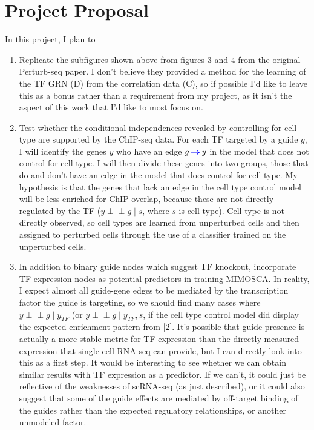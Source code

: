 \documentclass[letterpaper, 11pt]{article}
\def\ci{\perp\!\!\!\perp}
\DeclareMathOperator{\diedgeright}{\textcolor{blue}{\boldsymbol{\rightarrow}}}
\begin{document}
\section*{Project Proposal}
In this project, I plan to
\begin{enumerate}
\item Replicate the subfigures shown above from figures 3 and 4 from the original Perturb-seq paper. I don't believe they provided a method for the learning of the TF GRN (D) from the correlation data (C), so if possible I'd like to leave this as a bonus rather than a requirement from my project, as it isn't the aspect of this work that I'd like to most focus on.
\item Test whether the conditional independences revealed by controlling for cell type are supported by the ChIP-seq data. For each TF targeted by a guide $g$, I will identify the genes $y$ who have an edge $g \diedgeright y$ in the model that does not control for cell type. I will then divide these genes into two groups, those that do and don't have an edge in the model that does control for cell type. My hypothesis is that the genes that lack an edge in the cell type control model will be less enriched for ChIP overlap, because these are not directly regulated by the TF ($y \ci g \mid s$, where $s$ is cell type). Cell type is not directly observed, so cell types are learned from unperturbed cells and then assigned to perturbed cells through the use of a classifier trained on the unperturbed cells.
\item In addition to binary guide nodes which suggest TF knockout, incorporate TF expression nodes as potential predictors in training MIMOSCA. In reality, I expect almost all guide-gene edges to be mediated by the transcription factor the guide is targeting, so we should find many cases where $y \ci g \mid y_{TF}$ (or $y \ci g \mid y_{TF}, s$, if the cell type control model did display the expected enrichment pattern from [2]. It's possible that guide presence is actually a more stable metric for TF expression than the directly measured expression that single-cell RNA-seq can provide, but I can directly look into this as a first step. It would be interesting to see whether we can obtain similar results with TF expression as a predictor. If we can't, it could just be reflective of the weaknesses of scRNA-seq (as just described), or it could also suggest that some of the guide effects are mediated by off-target binding of the guides rather than the expected regulatory relationships, or another unmodeled factor.
\end{enumerate}
\end{document}
